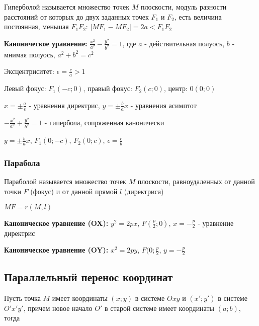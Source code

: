 \documentclass{article}
\begin{document}
\begin{flushleft}

Гиперболой называется множество точек $M$ плоскости, модуль разности расстояний от которых до двух заданных точек $F_1$ и $F_2$, есть величина постоянная, меньшая $F_1 F_2$: $| M F_1 - M F_2 | = 2a < F_1 F_2$

\hfill

\textbf{Каноническое уравнение:} $\frac{x^2}{a^2} - \frac{y^2}{b^2} = 1$, где $a$ - действительная полуось, $b$ - мнимая полуось, $a^2 + b^2 = c^2$

\hfill

Эксцентриситет: $\epsilon = \frac{c}{a} > 1$

Левый фокус: $F_1(-c; 0)$, правый фокус: $F_2(c; 0)$, центр: $0(0; 0)$

$x = \pm \frac{a}{\epsilon}$ - уравнения директрис, $y = \pm \frac{b}{a} x$ - уравнения асимптот

\hfill

$-\frac{x^2}{a^2} + \frac{y^2}{b^2} = 1$ - гипербола, сопряженная канонически

$y = \pm \frac{b}{a} x$, $F_1(0; -c)$, $F_2(0; c)$, $\epsilon = \frac{c}{b}$

\subsubsection{Парабола}

Параболой называется множество точек $M$ плоскости, равноудаленных от данной точки $F$ (фокус) и от данной прямой $l$ (директриса)

$M F = r (M, l)$

\hfill

\textbf{Каноническое уравнение (OX):} $y^2 = 2 p x$, $F (\frac{p}{2}; 0)$, $x = -\frac{p}{2}$ - уравнение директрис

\textbf{Каноническое уравнение (OY):} $x^2 = 2p y$, $F(0; \frac{p}{2}$, $y = -\frac{p}{2}$

\end{flushleft}

\subsection{Параллельный перенос координат}

Пусть точка $M$ имеет координаты $(x; y)$ в системе $O x y$ и $(x'; y')$ в системе $O' x' y'$, причем новое начало $O'$ в старой системе имеет координаты $(a; b)$, тогда 
\end{document}
